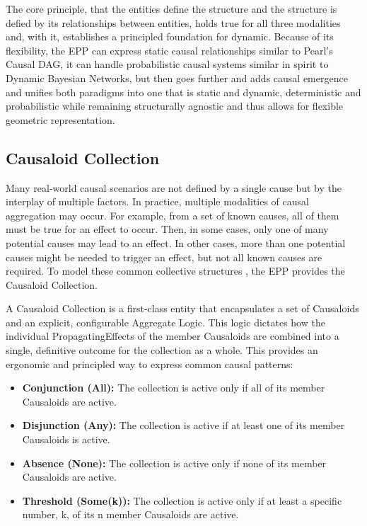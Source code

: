 The core principle, that the entities define the structure and the structure is defied by its relationships between entities, holds true for all three modalities and, with it, establishes a principled foundation for dynamic. Because of its flexibility, the EPP can express static causal relationships similar to Pearl’s Causal DAG, it can handle probabilistic causal systems similar in spirit to Dynamic Bayesian Networks, but then goes further and  adds causal emergence and unifies both paradigms into one that is static and dynamic, deterministic and probabilistic while remaining structurally agnostic and thus allows for flexible geometric representation.

%
%
\subsection{Causaloid Collection}
\label{sec:epp_causaloid_collection}


Many real-world causal scenarios are not defined by a single cause but by the interplay of multiple factors. In practice, multiple modalities of causal aggregation may occur. For example, from a set of known causes, all of them must be true for an effect to occur. Then, in some cases, only one of many potential causes may lead to an effect. In other cases, more than one potential causes might be needed to trigger an effect, but not all known causes are required. To model these common collective structures , the EPP provides the Causaloid Collection.

A Causaloid Collection is a first-class entity that encapsulates a set of Causaloids and an explicit, configurable Aggregate Logic. This logic dictates how the individual PropagatingEffects of the member Causaloids are combined into a single, definitive outcome for the collection as a whole. This provides an ergonomic and principled way to express common causal patterns:

\begin{itemize}
\item \textbf{Conjunction (All):} The collection is active only if all of its member Causaloids are active.
\item \textbf{Disjunction (Any):} The collection is active if at least one of its member Causaloids is active.
\item \textbf{Absence (None):} The collection is active only if none of its member Causaloids are active.
\item \textbf{Threshold (Some(k)):} The collection is active only if at least a specific number, k, of its n member Causaloids are active.
\end{itemize}

